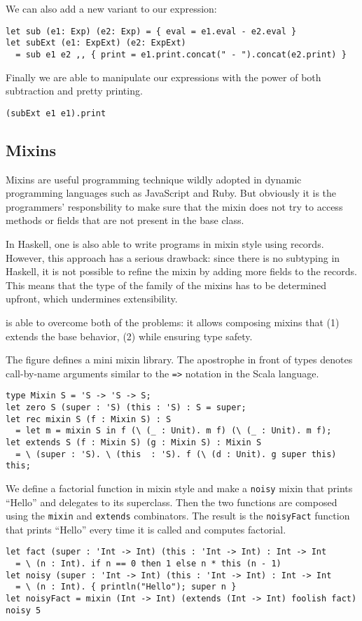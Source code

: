 We can also add a new variant to our expression:
\begin{verbatim}
let sub (e1: Exp) (e2: Exp) = { eval = e1.eval - e2.eval }
let subExt (e1: ExpExt) (e2: ExpExt)
  = sub e1 e2 ,, { print = e1.print.concat(" - ").concat(e2.print) }
\end{verbatim}

Finally we are able to manipulate our expressions with the power of both
subtraction and pretty printing.
\begin{verbatim}
(subExt e1 e1).print
\end{verbatim}

\subsection{Mixins}

Mixins are useful programming technique wildly adopted in dynamic programming
languages such as JavaScript and Ruby. But obviously it is the programmers'
responsbility to make sure that the mixin does not try to access methods or
fields that are not present in the base class.

In Haskell, one is also able to write programs in mixin style using records.
However, this approach has a serious drawback: since there is no subtyping in
Haskell, it is not possible to refine the mixin by adding more fields to the
records. This means that the type of the family of the mixins has to be
determined upfront, which undermines extensibility.

\name is able to overcome both of the problems: it allows composing mixins
that (1) extends the base behavior, (2) while ensuring type safety.

The figure defines a mini mixin library. The apostrophe in front of types
denotes call-by-name arguments similar to the \lstinline{=>} notation in the
Scala language.

\begin{lstlisting}
type Mixin S = 'S -> 'S -> S;
let zero S (super : 'S) (this : 'S) : S = super;
let rec mixin S (f : Mixin S) : S
  = let m = mixin S in f (\ (_ : Unit). m f) (\ (_ : Unit). m f);
let extends S (f : Mixin S) (g : Mixin S) : Mixin S
  = \ (super : 'S). \ (this  : 'S). f (\ (d : Unit). g super this) this;
\end{lstlisting}

We define a factorial function in mixin style and make a \lstinline{noisy} mixin
that prints ``Hello'' and delegates to its superclass. Then the two functions
are composed using the \lstinline{mixin} and \lstinline{extends} combinators.
The result is the \lstinline{noisyFact} function that prints ``Hello'' every
time it is called and computes factorial.
\begin{lstlisting}
let fact (super : 'Int -> Int) (this : 'Int -> Int) : Int -> Int
  = \ (n : Int). if n == 0 then 1 else n * this (n - 1)
let noisy (super : 'Int -> Int) (this : 'Int -> Int) : Int -> Int
  = \ (n : Int). { println("Hello"); super n }
let noisyFact = mixin (Int -> Int) (extends (Int -> Int) foolish fact)
noisy 5
\end{lstlisting}

